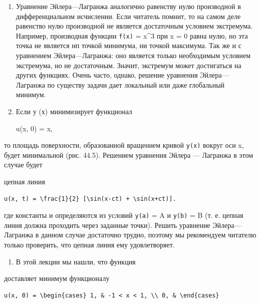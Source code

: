 \documentclass[
  ukrainian,
]{article}
\begin{document}
\begin{enumerate}
\def\labelenumi{\arabic{enumi}.}
\item
  Уравнение Эйлера---Лагранжа аналогично равенству нулю производной в
  дифференциальном исчислении. Если читатель помнит, то на самом деле
  равенство нулю производной не является достаточным условием
  экстремума. Например, производная функции \texttt{f(x)} = x\^{}3 при x
  = 0 равна нулю, но эта точка не является нп точкой минимума, ни точкой
  максимума. Так же и с уравнением Эйлера---Лагранжа: оно является
  только необходимым условием экстремума, но не достаточным. Значит,
  экстремум может достигаться на других функциях. Очень часто, однако,
  решение уравнения Эйлера---Лагранжа по существу задачи дает локальный
  или даже глобальный минимум.
\item
  Если у (х) минимизирует функционал

  u(x, 0) = \sin x,
\end{enumerate}

то площадь поверхности, образованной вращением кривой \texttt{y(x)}
вокруг оси x, будет минимальной (рис. 44.5). Решением уравнения Эйлера
--- Лагранжа в этом случае будет

цепная линия

\begin{verbatim}
u(x, t) = \frac{1}{2} [\sin(x-ct) + \sin(x+ct)].
\end{verbatim}

где константы \alpha   и \beta   определяются из условий \texttt{y(a)} =
A и \texttt{y(b)} = B (т. е. цепная линия должна проходить через
заданные точки). Решить уравнение Эйлера---Лагранжа в данном случае
достаточно трудно, поэтому мы рекомендуем читателю только проверить, что
цепная линия ему удовлетворяет.

\begin{enumerate}
\def\labelenumi{\arabic{enumi}.}
\setcounter{enumi}{2}
\item
  В этой лекции мы нашли, что функция

\end{enumerate}

доставляет минимум функционалу

\begin{verbatim}
u(x, 0) = \begin{cases} 1, & -1 < x < 1, \\ 0, & \end{cases}
\end{verbatim}
\end{document}
